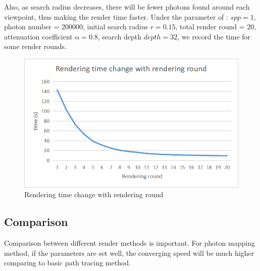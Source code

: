 \documentclass[acmtog]{acmart}
\begin{document}
	
	Also, as search radius decreases, there will be fewer photons found around each viewpoint, thus making the render time faster.
	Under the parameter of : $spp = 1$, photon number = 200000, initial search radius $r = 0.15$, total render round = 20, attenuation coefficient $\alpha = 0.8$,
	search depth $depth = 32$, we record the time for some render rounds.
	\begin{figure}[H]
		\centering
		\includegraphics[scale=0.5]{Images/render_round.png}
		\caption{Rendering time change with rendering round}\label{}
		\end{figure}
	\subsection{Comparison}
	Comparison between different render methods is important.
	For photon mapping method, if the parameters are set well, the converging speed will be much higher comparing to basic path tracing method.
\end{document}
